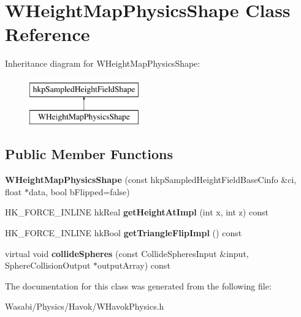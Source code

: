 \hypertarget{class_w_height_map_physics_shape}{}\section{W\+Height\+Map\+Physics\+Shape Class Reference}
\label{class_w_height_map_physics_shape}
Inheritance diagram for W\+Height\+Map\+Physics\+Shape\+:\begin{figure}[H]
\begin{center}
\leavevmode
\includegraphics[height=2.000000cm]{class_w_height_map_physics_shape}
\end{center}
\end{figure}
\subsection*{Public Member Functions}
\begin{DoxyCompactItemize}
\item 
{\bfseries W\+Height\+Map\+Physics\+Shape} (const hkp\+Sampled\+Height\+Field\+Base\+Cinfo \&ci, float $\ast$data, bool b\+Flipped=false)\hypertarget{class_w_height_map_physics_shape_a360cb494bf390677e00b4661d5c0995e}{}\label{class_w_height_map_physics_shape_a360cb494bf390677e00b4661d5c0995e}

\item 
H\+K\+\_\+\+F\+O\+R\+C\+E\+\_\+\+I\+N\+L\+I\+NE hk\+Real {\bfseries get\+Height\+At\+Impl} (int x, int z) const \hypertarget{class_w_height_map_physics_shape_adf78816c2c6c192d5063bf81747b8ae7}{}\label{class_w_height_map_physics_shape_adf78816c2c6c192d5063bf81747b8ae7}

\item 
H\+K\+\_\+\+F\+O\+R\+C\+E\+\_\+\+I\+N\+L\+I\+NE hk\+Bool {\bfseries get\+Triangle\+Flip\+Impl} () const \hypertarget{class_w_height_map_physics_shape_a2d0bee2cfcfbfca0530e9290a48d5c81}{}\label{class_w_height_map_physics_shape_a2d0bee2cfcfbfca0530e9290a48d5c81}

\item 
virtual void {\bfseries collide\+Spheres} (const Collide\+Spheres\+Input \&input, Sphere\+Collision\+Output $\ast$output\+Array) const \hypertarget{class_w_height_map_physics_shape_a26c55ed03580343ad5d1c3a530574f25}{}\label{class_w_height_map_physics_shape_a26c55ed03580343ad5d1c3a530574f25}

\end{DoxyCompactItemize}


The documentation for this class was generated from the following file\+:\begin{DoxyCompactItemize}
\item 
Wasabi/\+Physics/\+Havok/W\+Havok\+Physics.\+h\end{DoxyCompactItemize}
